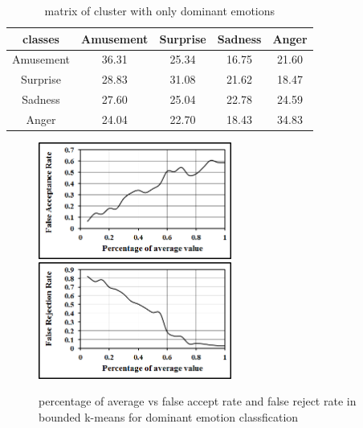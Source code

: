 \begin{center}

\begin{table}

\centering
\begin{tabular}{ |c|c|c|c|c| } 
 \hline
 classes & Amusement & Surprise & Sadness & Anger \\
\hline
Amusement & 36.31 &  25.34 &  16.75 &  21.60 \\ 
Surprise & 28.83 &  31.08 &  21.62 &  18.47 \\
Sadness & 27.60 &  25.04 &  22.78  & 24.59 \\ 
Anger & 24.04 &  22.70 &  18.43 &  34.83 \\

\hline
\end{tabular}

\caption{matrix of cluster with only dominant emotions}
\label{table:4}
\end{table}
\end{center}

\begin{figure}
\centering
\includegraphics[width=2.5in,clip,keepaspectratio]{Chapters/figures/Emotion/dominant/fA}
\includegraphics[width=2.5in,clip,keepaspectratio]{Chapters/figures/Emotion/dominant/fR}

\caption{percentage of average vs false accept rate and false reject rate in bounded k-means for dominant emotion classfication}
\label{Optional 6}
\end{figure}

